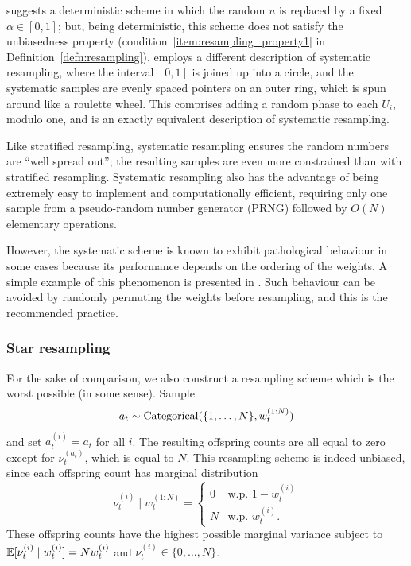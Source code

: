 \textcite{kitagawa1996} suggests a deterministic scheme in which the random $u$ is replaced by a fixed $\alpha\in[0,1]$; but, being deterministic, this scheme does not satisfy the unbiasedness property (condition~\ref{item:resampling_property1} in Definition~\ref{defn:resampling}).
\textcite{whitley1994} employs a different description of systematic resampling, where the interval $[0,1]$ is joined up into a circle, and the systematic samples are evenly spaced pointers on an outer ring, which is spun around like a roulette wheel. This comprises adding a random phase to each $U_i$, modulo one, and is an exactly equivalent description of systematic resampling.

Like stratified resampling, systematic resampling ensures the random numbers are ``well spread out''; the resulting samples are even more constrained than with stratified resampling. 
Systematic resampling also has the advantage of being extremely easy to implement and computationally efficient, requiring only one sample from a pseudo-random number generator (PRNG) followed by $O(N)$ elementary operations.

However, the systematic scheme is known to exhibit pathological behaviour in some cases because its performance depends on the ordering of the weights. A simple example of this phenomenon is presented in \textcite{douc2005}. 
Such behaviour can be avoided by randomly permuting the weights before resampling, and this is the recommended practice\seb{[citation?]}. 



\subsubsection{Star resampling}
For the sake of comparison, we also construct a resampling scheme which is the worst possible (in some sense).
Sample
\begin{equation*}
a_t \sim \operatorname{Categorical}( \{1,\dots, N\}, w_t^{(1:N)} )
\end{equation*}
and set $a_t^{(i)} = a_t$ for all $i$.
The resulting offspring counts are all equal to zero except for $\nu_t^{(a_t)}$, which is equal to $N$.
This resampling scheme is indeed unbiased, since each offspring count has marginal distribution
\begin{equation*}
\nu_t^{(i)}  \mid w_t^{(1:N)} 
= \begin{cases}
0 & \text{w.p. } 1-w_t^{(i)} \\
N & \text{w.p. } w_t^{(i)} .
\end{cases}
\end{equation*}
These offspring counts have the highest possible marginal variance subject to $\mathbb{E}[ \nu_t^{(i)}  \mid w_t^{(i)} ] = Nw_t^{(i)}$ and $\nu_t^{(i)} \in \{0,\dots,N\}$.

